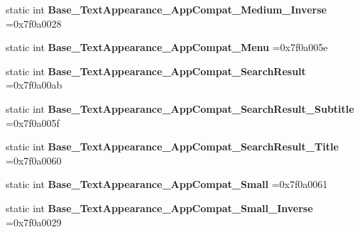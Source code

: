 \begin{DoxyCompactItemize}
\item 
\mbox{\label{classandroid_1_1support_1_1v7_1_1mediarouter_1_1R_1_1style_a6c596618ad2d25908c8694453f2de174}} 
static int {\bfseries Base\+\_\+\+Text\+Appearance\+\_\+\+App\+Compat\+\_\+\+Medium\+\_\+\+Inverse} =0x7f0a0028
\item 
\mbox{\label{classandroid_1_1support_1_1v7_1_1mediarouter_1_1R_1_1style_a93fe344267b162e536202f9e9ba8868d}} 
static int {\bfseries Base\+\_\+\+Text\+Appearance\+\_\+\+App\+Compat\+\_\+\+Menu} =0x7f0a005e
\item 
\mbox{\label{classandroid_1_1support_1_1v7_1_1mediarouter_1_1R_1_1style_a3e021955d13d7a6f31bcf6627e9e51a5}} 
static int {\bfseries Base\+\_\+\+Text\+Appearance\+\_\+\+App\+Compat\+\_\+\+Search\+Result} =0x7f0a00ab
\item 
\mbox{\label{classandroid_1_1support_1_1v7_1_1mediarouter_1_1R_1_1style_a7cfda9e691fa26fee50b24e5f9fb140f}} 
static int {\bfseries Base\+\_\+\+Text\+Appearance\+\_\+\+App\+Compat\+\_\+\+Search\+Result\+\_\+\+Subtitle} =0x7f0a005f
\item 
\mbox{\label{classandroid_1_1support_1_1v7_1_1mediarouter_1_1R_1_1style_a073b82625a33675bcf95a9177db866c7}} 
static int {\bfseries Base\+\_\+\+Text\+Appearance\+\_\+\+App\+Compat\+\_\+\+Search\+Result\+\_\+\+Title} =0x7f0a0060
\item 
\mbox{\label{classandroid_1_1support_1_1v7_1_1mediarouter_1_1R_1_1style_abfaf0acaa870133f75641cdd3712220e}} 
static int {\bfseries Base\+\_\+\+Text\+Appearance\+\_\+\+App\+Compat\+\_\+\+Small} =0x7f0a0061
\item 
\mbox{\label{classandroid_1_1support_1_1v7_1_1mediarouter_1_1R_1_1style_ac1533a82c1d2917b59ebdc899e80762b}} 
static int {\bfseries Base\+\_\+\+Text\+Appearance\+\_\+\+App\+Compat\+\_\+\+Small\+\_\+\+Inverse} =0x7f0a0029
\item 

\end{DoxyCompactItemize}
